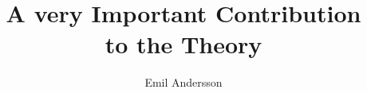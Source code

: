\begin{titlepages}
\author{Emil Andersson}
\title{A very Important Contribution\\ to the Theory}
\end{titlepages}